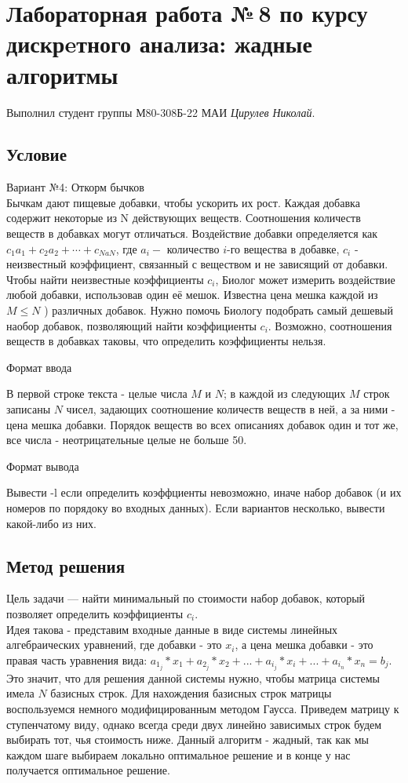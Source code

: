 \documentclass[12pt]{article}
\begin{document}
\section*{Лабораторная работа №\,8 по курсу дискрeтного анализа: жадные алгоритмы}

Выполнил студент группы М80-308Б-22 МАИ \textit{Цирулев Николай}.

\subsection*{Условие}
Вариант №4: Откорм бычков\\
Бычкам дают пищевые добавки, чтобы ускорить их рост. Каждая добавка содержит некоторые из N действующих веществ. Соотношения количеств веществ в добавках могут отличаться. Воздействие добавки определяется как $c_1 a_1+c_2 a_2+\cdots+c_{N a N}$, где $a_i-$ количество $i$-го вещества в добавке, $c_i$ - неизвестный коэффициент, связанный с веществом и не зависящий от добавки. Чтобы найти неизвестные коэффициенты $c_i$, Биолог может измерить воздействие любой добавки, использовав один её мешок. Известна цена мешка каждой из $M \leq N$ ) различных добавок. Нужно помочь Биологу подобрать самый дешевый наобор добавок, позволяющий найти коэффициенты $c_i$. Возможно, соотношения веществ в добавках таковы, что определить коэффициенты нельзя.

Формат ввода

В первой строке текста - целые числа $M$ и $N$; в каждой из следующих $M$ строк записаны $N$ чисел, задающих соотношение количеств веществ в ней, а за ними - цена мешка добавки. Порядок веществ во всех описаниях добавок один и тот же, все числа - неотрицательные целые не больше 50.

Формат вывода

Вывести -l если определить коэффциенты невозможно, иначе набор добавок (и их номеров по порядоку во входных данных). Если вариантов несколько, вывести какой-либо из них.

\subsection*{Метод решения}
Цель задачи — найти минимальный по стоимости набор добавок, который позволяет определить коэффициенты $c_i$.\\ Идея такова - представим входные данные в виде системы линейных алгебраических уравнений, где добавки - это $x_i$, а цена мешка добавки - это правая часть уравнения вида: $a_1_j * x_1 + a_2_j * x_2 + ... + a_i_j * x_i + ... + a_i_n * x_n = b_j$.
\\
Это значит, что для решения данной системы нужно, чтобы матрица системы имела $N$ базисных строк. Для нахождения базисных строк матрицы воспользуемся немного модифицированным методом Гаусса. Приведем матрицу к ступенчатому виду, однако всегда среди двух линейно зависимых строк будем выбирать тот, чья стоимость ниже. Данный алгоритм - жадный, так как мы каждом шаге выбираем локально оптимальное решение и в конце у нас получается оптимальное решение.
\end{document}
